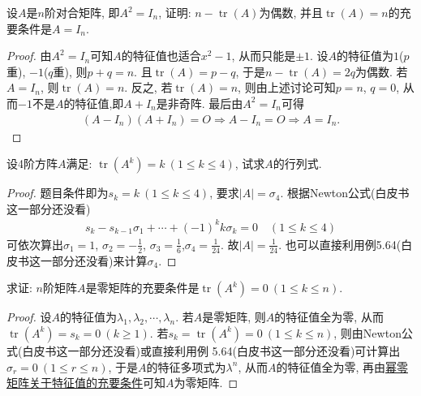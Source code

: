 \documentclass[../../main.tex]{subfiles}
\begin{document}
\begin{example}
设$A$是$n$阶对合矩阵, 即$A^2 = I_n$, 证明: $n - \operatorname{tr}(A)$为偶数, 并且$\operatorname{tr}(A) = n$的充要条件是$A = I_n$.
\end{example}
\begin{proof}
由$A^2 = I_n$可知$A$的特征值也适合$x^2 - 1$, 从而只能是$\pm 1$. 设$A$的特征值为$1$($p$重), $-1$($q$重), 则$p + q = n$. 且$\operatorname{tr}(A) = p - q$, 于是$n - \operatorname{tr}(A) = 2q$为偶数. 若$A = I_n$, 则$\operatorname{tr}(A) = n$. 反之, 若$\operatorname{tr}(A) = n$, 则由上述讨论可知$p = n$, $q = 0$, 从而$-1$不是$A$的特征值,即$A + I_n$是非奇阵. 最后由$A^2=I_n$可得
\begin{align*}
(A - I_n)(A + I_n) = O\Rightarrow A-I_n=O\Rightarrow A = I_n.
\end{align*}
\end{proof}

\begin{example}
设4阶方阵$A$满足: $\operatorname{tr}(A^k) = k \ (1 \leq k \leq 4)$, 试求$A$的行列式.
\end{example}
\begin{proof}
题目条件即为$s_k = k \ (1 \leq k \leq 4)$, 要求$\lvert A \rvert = \sigma_4$. 根据Newton公式(白皮书这一部分还没看)
\begin{align*}
s_k - s_{k-1} \sigma_1 + \cdots + (-1)^k k \sigma_k = 0 \quad (1 \leq k \leq 4)
\end{align*}
可依次算出$\sigma_1 = 1$, $\sigma_2 = -\frac{1}{2}$, $\sigma_3 = \frac{1}{6}$,$\sigma_4 = \frac{1}{24}.$
故$\lvert A \rvert = \frac{1}{24}$. 也可以直接利用例5.64(白皮书这一部分还没看)来计算$\sigma_4$.
\end{proof}

\begin{proposition}[幂零矩阵关于迹的充要条件]\label{proposition:幂零矩阵关于迹的充要条件}
求证: $n$阶矩阵$A$是零矩阵的充要条件是$\operatorname{tr}(A^k) = 0 \ (1 \leq k \leq n)$.
\end{proposition}
\begin{proof}
设$A$的特征值为$\lambda_1, \lambda_2, \cdots, \lambda_n$. 若$A$是零矩阵, 则$A$的特征值全为零, 从而$\operatorname{tr}(A^k) = s_k = 0 \ (k \geq 1)$. 若$s_k = \operatorname{tr}(A^k) = 0 \ (1 \leq k \leq n)$, 则由Newton公式(白皮书这一部分还没看)或直接利用例 5.64(白皮书这一部分还没看)可计算出$\sigma_r = 0 \ (1 \leq r \leq n)$, 于是$A$的特征多项式为$\lambda^n$, 从而$A$的特征值全为零, 再由\hyperref[proposition:幂零矩阵关于特征值的充要条件]{幂零矩阵关于特征值的充要条件}可知$A$为零矩阵.
\end{proof}
\end{document}
